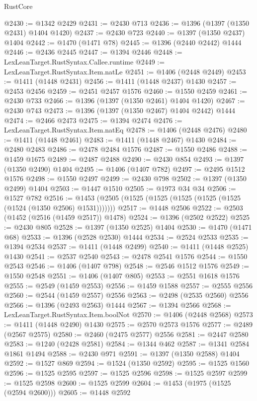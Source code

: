 \begin{lexlean}{RustCore}
\begin{coremodule}
@2430 := @1342 @2429
@2431 := @2430 @713
@2436 := @1396 (@1397 (@1350 @2431) @1404 @1420)
@2437 := @2430 @723
@2440 := @1397 (@1350 @2437) @1404
@2442 := @1470 (@1471 @78)
@2445 := @1396 (@2440 @2442) @1444
@2446 := @2436 @2445
@2447 := @1394 @2446
@2448 := LexLeanTarget.RustSyntax.Callee.runtime
@2449 := LexLeanTarget.RustSyntax.Item.natLe
@2451 := @1406 (@2448 @2449)
@2453 := @1411 (@1448 @2431)
@2456 := @1411 (@1448 @2437) @1430
@2457 := @2453 @2456
@2459 := @2451 @2457 @1576
@2460 := @1550 @2459
@2461 := @2430 @733
@2466 := @1396 (@1397 (@1350 @2461) @1404 @1420)
@2467 := @2430 @743
@2473 := @1396 (@1397 (@1350 @2467) @1404 @2442) @1444
@2474 := @2466 @2473
@2475 := @1394 @2474
@2476 := LexLeanTarget.RustSyntax.Item.natEq
@2478 := @1406 (@2448 @2476)
@2480 := @1411 (@1448 @2461)
@2483 := @1411 (@1448 @2467) @1430
@2484 := @2480 @2483
@2486 := @2478 @2484 @1576
@2487 := @1550 @2486
@2488 := @1459 @1675
@2489 := @2487 @2488
@2490 := @2430 @854
@2493 := @1397 (@1350 @2490) @1404
@2495 := @1406 (@1407 @782)
@2497 := @2495 @1512 @1576
@2498 := @1550 @2497
@2499 := @2430 @798
@2502 := @1397 (@1350 @2499) @1404
@2503 := @1447 @1510
@2505 := @1973 @34 @34
@2506 := @1527 @782
@2516 := @1453 (@2505 (@1525 (@1525 (@1525 (@1525 (@1525 (@1524 (@1350 @2506) @1531)))))))
@2517 := @1448 @2506
@2522 := @2503 (@1452 (@2516 (@1459 @2517)) @1478)
@2524 := @1396 (@2502 @2522)
@2525 := @2430 @805
@2528 := @1397 (@1350 @2525) @1404
@2530 := @1470 (@1471 @68)
@2533 := @1396 (@2528 @2530) @1444
@2534 := @2524 @2533
@2535 := @1394 @2534
@2537 := @1411 (@1448 @2499)
@2540 := @1411 (@1448 @2525) @1430
@2541 := @2537 @2540
@2543 := @2478 @2541 @1576
@2544 := @1550 @2543
@2546 := @1406 (@1407 @798)
@2548 := @2546 @1512 @1576
@2549 := @1550 @2548
@2551 := @1406 (@1407 @805)
@2553 := @2551 @1618 @1576
@2555 := @2549 (@1459 @2553)
@2556 := @1459 @1588
@2557 := @2555 @2556
@2560 := @2544 (@1459 @2557) @2556
@2563 := @2498 (@2535 @2560) @2556
@2566 := @1396 (@2493 @2563) @1444
@2567 := @1394 @2566
@2568 := LexLeanTarget.RustSyntax.Item.boolNot
@2570 := @1406 (@2448 @2568)
@2573 := @1411 (@1448 @2490) @1430
@2575 := @2570 @2573 @1576
@2577 := @2489 (@2567 @2575)
@2580 := @2460 (@2475 @2577) @2556
@2581 := @2447 @2580
@2583 := @1240 (@2428 @2581)
@2584 := @1344 @462
@2587 := @1341 @2584 @1861 @1494
@2588 := @2430 @971
@2591 := @1397 (@1350 @2588) @1404
@2592 := @1527 @869
@2594 := @1524 (@1350 @2592)
@2595 := @1525 @1560
@2596 := @1525 @2595
@2597 := @1525 @2596
@2598 := @1525 @2597
@2599 := @1525 @2598
@2600 := @1525 @2599
@2604 := @1453 (@1975 (@1525 (@2594 @2600)))
@2605 := @1448 @2592

\end{coremodule}
\end{lexlean}
